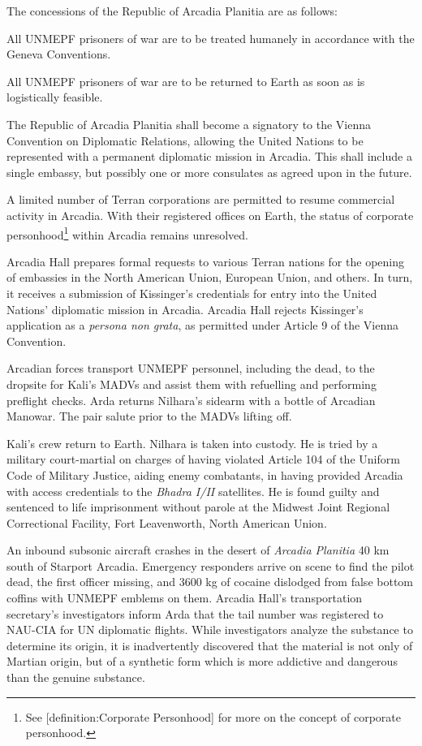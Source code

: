 The concessions of the Republic of Arcadia Planitia are as follows:
\startitemize[n]
\item All UNMEPF prisoners of war are to be treated humanely in accordance with the Geneva Conventions.
\item All UNMEPF prisoners of war are to be returned to Earth as soon as is logistically feasible.
\item The Republic of Arcadia Planitia shall become a signatory to the Vienna Convention on Diplomatic Relations, allowing the United Nations to be represented with a permanent diplomatic mission in Arcadia. This shall include a single embassy, but possibly one or more consulates as agreed upon in the future.
\item A limited number of Terran corporations are permitted to resume commercial activity in Arcadia. With their registered offices on Earth, the status of corporate personhood\footnote{See [definition:Corporate Personhood] for more on the concept of corporate personhood.} within Arcadia remains unresolved.
\stopitemize

Arcadia Hall prepares formal requests to various Terran nations for the opening of embassies in the North American Union, European Union, and others. In turn, it receives a submission of Kissinger's credentials for entry into the United Nations' diplomatic mission in Arcadia. Arcadia Hall rejects Kissinger's application as a {\it persona non grata}, as permitted under Article 9 of the Vienna Convention.
\StopTimelineDate

Arcadian forces transport UNMEPF personnel, including the dead, to the dropsite for Kali's MADVs and assist them with refuelling and performing preflight checks. Arda returns Nilhara's sidearm with a bottle of Arcadian Manowar. The pair salute prior to the MADVs lifting off.
\StopTimelineDate

Kali's crew return to Earth. Nilhara is taken into custody. He is tried by a military court-martial on charges of having violated Article 104 of the Uniform Code of Military Justice, aiding enemy combatants, in having provided Arcadia with access credentials to the {\it Bhadra I/II} satellites. He is found guilty and sentenced to life imprisonment without parole at the Midwest Joint Regional Correctional Facility, Fort Leavenworth, North American Union.
\StopTimelineDate

An inbound subsonic aircraft crashes in the desert of {\it Arcadia Planitia} 40 km south of Starport Arcadia. Emergency responders arrive on scene to find the pilot dead, the first officer missing, and 3600 kg of cocaine dislodged from false bottom coffins with UNMEPF emblems on them. Arcadia Hall's transportation secretary's investigators inform Arda that the tail number was registered to NAU-CIA for UN diplomatic flights. While investigators analyze the substance to determine its origin, it is inadvertently discovered that the material is not only of Martian origin, but of a synthetic form which is more addictive and dangerous than the genuine substance.
\StopTimelineDate


